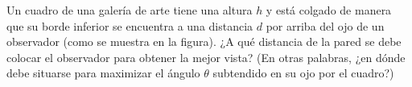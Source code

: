 \item Un cuadro de una galería de arte tiene una altura $h$ y está colgado de manera que su borde inferior se encuentra a una distancia $d$ por arriba del ojo de un observador (como se muestra en la figura). ¿A qué distancia de la pared se debe colocar el observador para obtener la mejor vista? (En otras palabras, ¿en dónde debe situarse para maximizar el ángulo $\theta$ subtendido en su ojo por el cuadro?)
